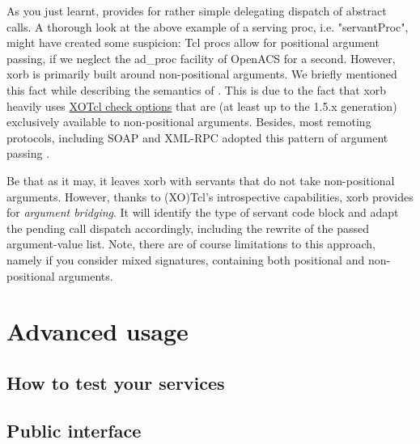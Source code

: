 As you just learnt,  provides for rather simple delegating dispatch of abstract calls. A thorough look at the above example of a serving proc, i.e. "servantProc", might have created some suspicion: Tcl procs allow for positional argument passing, if we neglect the ad\_proc facility of OpenACS for a second. However, xorb is primarily built around non-positional arguments. We briefly mentioned this fact while describing the semantics of . This is due to the fact that xorb heavily uses \href{http://media.wu-wien.ac.at/doc/tutorial.html#non-pos-args}{XOTcl check options} that are (at least up to the 1.5.x generation) exclusively available to non-positional arguments. Besides, most remoting protocols, including SOAP and XML-RPC adopted this pattern of argument passing \cite{zdun:2005b}. 

Be that as it may, it leaves xorb with servants that do not take non-positional arguments. However, thanks to (XO)Tcl's introspective capabilities, xorb provides for \emph{argument bridging}. It will identify the type of servant code block and adapt the pending call dispatch accordingly, including the rewrite of the passed argument-value list. Note, there are of course limitations to this approach, namely if you consider mixed signatures, containing both positional and non-positional arguments.


  \section{Advanced usage}\label{sec:advanced}
  \subsection{How to test your services}
    \subsection{Public interface}\label{sec:interface}
